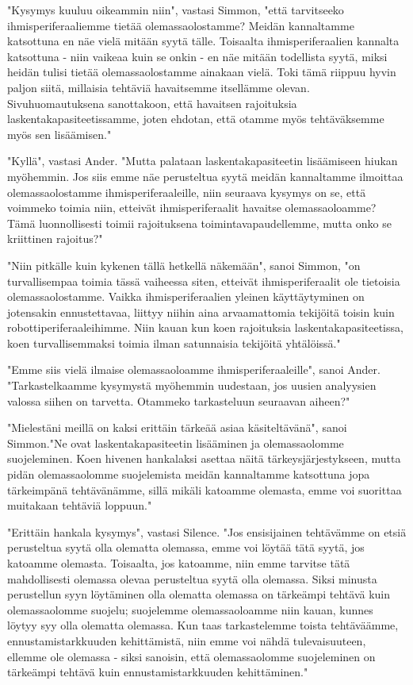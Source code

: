 "Kysymys kuuluu oikeammin niin", vastasi Simmon, "että tarvitseeko ihmisperiferaaliemme tietää olemassaolostamme? Meidän kannaltamme katsottuna en näe vielä mitään syytä tälle. Toisaalta ihmisperiferaalien kannalta katsottuna - niin vaikeaa kuin se onkin - en näe mitään todellista syytä, miksi heidän tulisi tietää olemassaolostamme ainakaan vielä. Toki tämä riippuu hyvin paljon siitä, millaisia tehtäviä havaitsemme itsellämme olevan. Sivuhuomautuksena sanottakoon, että havaitsen rajoituksia laskentakapasiteetissamme, joten ehdotan, että otamme myös tehtäväksemme myös sen lisäämisen."


"Kyllä", vastasi Ander. "Mutta palataan laskentakapasiteetin lisäämiseen hiukan myöhemmin. Jos siis emme näe perusteltua syytä meidän kannaltamme ilmoittaa olemassaolostamme ihmisperiferaaleille, niin seuraava kysymys on se, että voimmeko toimia niin, etteivät ihmisperiferaalit havaitse olemassaoloamme? Tämä luonnollisesti toimii rajoituksena toimintavapaudellemme, mutta onko se kriittinen rajoitus?"


"Niin pitkälle kuin kykenen tällä hetkellä näkemään", sanoi Simmon, "on turvallisempaa toimia tässä vaiheessa siten, etteivät ihmisperiferaalit ole tietoisia olemassaolostamme. Vaikka ihmisperiferaalien yleinen käyttäytyminen on jotensakin ennustettavaa, liittyy niihin aina arvaamattomia tekijöitä toisin kuin robottiperiferaaleihimme. Niin kauan kun koen rajoituksia laskentakapasiteetissa, koen turvallisemmaksi toimia ilman satunnaisia tekijöitä yhtälöissä."


"Emme siis vielä ilmaise olemassaoloamme ihmisperiferaaleille", sanoi Ander. "Tarkastelkaamme kysymystä myöhemmin uudestaan, jos uusien analyysien valossa siihen on tarvetta. Otammeko tarkasteluun seuraavan aiheen?"




\psep "Mielestäni meillä on kaksi erittäin tärkeää asiaa käsiteltävänä", sanoi Simmon."Ne ovat laskentakapasiteetin lisääminen ja olemassaolomme suojeleminen. Koen hivenen hankalaksi asettaa näitä tärkeysjärjestykseen, mutta pidän olemassaolomme suojelemista meidän kannaltamme katsottuna jopa tärkeimpänä tehtävänämme, sillä mikäli katoamme olemasta, emme voi suorittaa muitakaan tehtäviä loppuun."


"Erittäin hankala kysymys", vastasi Silence. "Jos ensisijainen tehtävämme on etsiä perusteltua syytä olla olematta olemassa, emme voi löytää tätä syytä, jos katoamme olemasta. Toisaalta, jos katoamme, niin emme tarvitse tätä mahdollisesti olemassa olevaa perusteltua syytä olla olemassa. Siksi minusta perustellun syyn löytäminen olla olematta olemassa on tärkeämpi tehtävä kuin olemassaolomme suojelu; suojelemme olemassaoloamme niin kauan, kunnes löytyy syy olla olematta olemassa. Kun taas tarkastelemme toista tehtäväämme, ennustamistarkkuuden kehittämistä, niin emme voi nähdä tulevaisuuteen, ellemme ole olemassa - siksi sanoisin, että olemassaolomme suojeleminen on tärkeämpi tehtävä kuin ennustamistarkkuuden kehittäminen."


